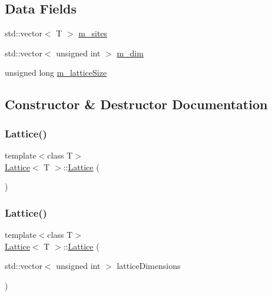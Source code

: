 \subsection*{Data Fields}
\begin{DoxyCompactItemize}
\item 
std\+::vector$<$ T $>$ \mbox{\hyperlink{class_lattice_a605a93a5b2a973811f7cff44a8ab84f7}{m\+\_\+sites}}
\item 
std\+::vector$<$ unsigned int $>$ \mbox{\hyperlink{class_lattice_a6adf73dcd2ef1663d7d38b192f7fd91e}{m\+\_\+dim}}
\item 
unsigned long \mbox{\hyperlink{class_lattice_a933045fb4a76f62d29472e6061ed8a34}{m\+\_\+lattice\+Size}}
\end{DoxyCompactItemize}


\subsection{Constructor \& Destructor Documentation}
\mbox{\label{class_lattice_ac32e6300cc5ebc246a060cd67d99f370}} 
\subsubsection{\texorpdfstring{Lattice()}{Lattice()}\hspace{0.1cm}{\footnotesize\ttfamily [1/4]}}
{\footnotesize\ttfamily template$<$class T$>$ \\
\mbox{\hyperlink{class_lattice}{Lattice}}$<$ T $>$\+::\mbox{\hyperlink{class_lattice}{Lattice}} (\begin{DoxyParamCaption}{ }\end{DoxyParamCaption})\hspace{0.3cm}{\ttfamily [inline]}}

\mbox{\label{class_lattice_a0c212e4f17842acee8697ce79eef3dff}} 
\subsubsection{\texorpdfstring{Lattice()}{Lattice()}\hspace{0.1cm}{\footnotesize\ttfamily [2/4]}}
{\footnotesize\ttfamily template$<$class T$>$ \\
\mbox{\hyperlink{class_lattice}{Lattice}}$<$ T $>$\+::\mbox{\hyperlink{class_lattice}{Lattice}} (\begin{DoxyParamCaption}\item[{std\+::vector$<$ unsigned int $>$}]{lattice\+Dimensions }\end{DoxyParamCaption})\hspace{0.3cm}{\ttfamily [inline]}}

